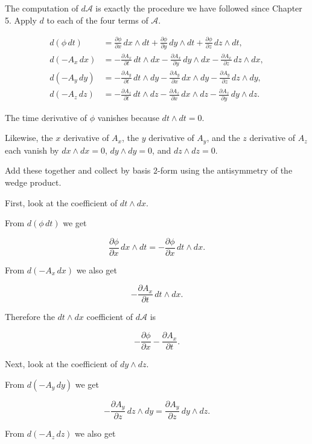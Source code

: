 \documentclass[a4paper,12pt,openany]{book}
\begin{document}
The computation of \(d\mathcal{A}\) is exactly the procedure we have
followed since Chapter 5. Apply \(d\) to each of the four terms of
\(\mathcal{A}\).

\[
\begin{aligned}
d(\phi\,dt)
&=
\frac{\partial\phi}{\partial x}\,dx\wedge dt
+
\frac{\partial\phi}{\partial y}\,dy\wedge dt
+
\frac{\partial\phi}{\partial z}\,dz\wedge dt,
\\[0.5em]
d(-A_x\,dx)
&=
-\frac{\partial A_x}{\partial t}\,dt\wedge dx
-
\frac{\partial A_x}{\partial y}\,dy\wedge dx
-
\frac{\partial A_x}{\partial z}\,dz\wedge dx,
\\[0.5em]
d(-A_y\,dy)
&=
-\frac{\partial A_y}{\partial t}\,dt\wedge dy
-
\frac{\partial A_y}{\partial x}\,dx\wedge dy
-
\frac{\partial A_y}{\partial z}\,dz\wedge dy,
\\[0.5em]
d(-A_z\,dz)
&=
-\frac{\partial A_z}{\partial t}\,dt\wedge dz
-
\frac{\partial A_z}{\partial x}\,dx\wedge dz
-
\frac{\partial A_z}{\partial y}\,dy\wedge dz.
\end{aligned}
\]

The time derivative of \(\phi\) vanishes because \(dt\wedge dt=0\).

Likewise, the \(x\) derivative of \(A_x\), the \(y\) derivative of
\(A_y\), and the \(z\) derivative of \(A_z\) each vanish by
\(dx\wedge dx=0\), \(dy\wedge dy=0\), and \(dz\wedge dz=0\).

Add these together and collect by basis \(2\)-form using the
antisymmetry of the wedge product.

First, look at the coefficient of \(dt\wedge dx\).

From \(d(\phi\,dt)\) we get

\[
\frac{\partial\phi}{\partial x}\,dx\wedge dt
=
-\frac{\partial\phi}{\partial x}\,dt\wedge dx.
\]

From \(d(-A_x\,dx)\) we also get

\[
-\frac{\partial A_x}{\partial t}\,dt\wedge dx.
\]

Therefore the \(dt\wedge dx\) coefficient of \(d\mathcal{A}\) is

\[
-\frac{\partial\phi}{\partial x}
-
\frac{\partial A_x}{\partial t}.
\]

Next, look at the coefficient of \(dy\wedge dz\).

From \(d(-A_y\,dy)\) we get

\[
-\frac{\partial A_y}{\partial z}\,dz\wedge dy
=
\frac{\partial A_y}{\partial z}\,dy\wedge dz.
\]

From \(d(-A_z\,dz)\) we also get
\end{document}
